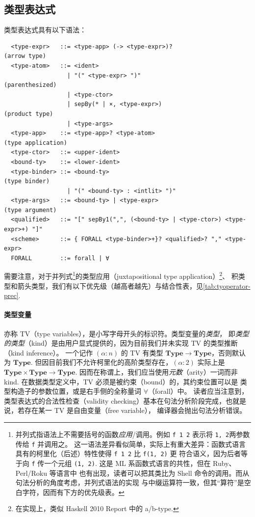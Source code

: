 \documentclass[a4paper, 11pt]{article}
\theoremstyle{remark}\newtheorem*{remark}{Remark}
\theoremstyle{definition}\newtheorem*{definition}{Definition}
\begin{document}
\subsection{类型表达式}
类型表达式具有以下语法：
\begin{verbatim}
  <type-expr>   ::= <type-app> (-> <type-expr>)?                                 (arrow type)
  <type-atom>   ::= <ident>
                  | "(" <type-expr> ")"                                          (parenthesized)
                  | <type-ctor>
                  | sepBy(* | ×, <type-expr>)                                    (product type)
                  | <type-args>
  <type-app>    ::= <type-app>? <type-atom>                                      (type application)
  <type-ctor>   ::= <upper-ident>
  <bound-ty>    ::= <lower-ident>
  <type-binder> ::= <bound-ty>                                                   (type binder)
                  | "(" <bound-ty> : <intlit> ")"
  <type-args>   ::= <bound-ty> | <type-expr>                                     (type argument)
  <qualified>   ::= "[" sepBy1(",", (<bound-ty> | <type-ctor>) <type-expr>+) "]"
  <scheme>      ::= { FORALL <type-binder>+}? <qualified>? "," <type-expr>
  FORALL        ::= forall | ∀
\end{verbatim}
需要注意，对于并列式\footnote{
  并列式指语法上不需要括号的函数\emph{应用}/调用。例如 \texttt{f 1 2} 表示将 \texttt{1, 2}两参数传给 \texttt{f} 并调用之。
  这一语法差异看似简单，实际上有重大差异：函数式语言具有的柯里化（后述）特性使得 \texttt{f 1 2} 比 \texttt{f(1, 2)} 更
  符合语义，因为后者等于向 \texttt{f} 传一个元组 \texttt{(1, 2)}. 这是 ML 系函数式语言的共性，但在 Ruby、Perl/Roku 等语言中
  也有出现，读者可以把其类比为 Shell 命令的调用。而从句法分析的角度考虑，并列式语法的实现
  与中缀运算符一致，但其“算符”是空白字符，因而有下方的优先级表。
}的类型应用（juxtapositional type application）\footnote{
  在实现上，类似 Haskell 2010 Report 中的 a/b-type.
}、
积类型和箭头类型，我们有以下优先级（越高者越先）与结合性表，见\autoref{tab:tyoperator-prec}.
\paragraph*{类型变量}\label{fn:HKT} 亦称 TV（type variables），是小写字母开头的标识符。类型变量的\emph{类型}，
即\emph{类型的类型}（kind）是由用户显式提供的，因为目前我们并未实现 TV 的类型推断（kind inference）。
一个记作 \((\alpha : n)\) 的 TV 有类型 \(\mathbf{Type}\to \mathbf{Type}\)，否则默认为 $\mathbf{Type}$.
但因目前我们不允许柯里化的高阶类型存在，\((\alpha : 2)\) 实际上是 \(\mathbf{Type}\times\mathbf{Type}\to\mathbf{Type}\).
因而在称谓上，我们应当使用\emph{元数}（arity）一词而非 kind. 在数据类型定义中，TV 必须是被约束（bound）的，其约束位置可以是
类型构造子的参数位置，或是右手侧的全称量词 $\forall$（forall）中。
读者应当注意到，类型表达式的合法性检查（validity checking）基本在句法分析阶段完成，也就是说，若存在某一 TV 是自由变量（free variable），
编译器会抛出句法分析错误。
\end{document}
